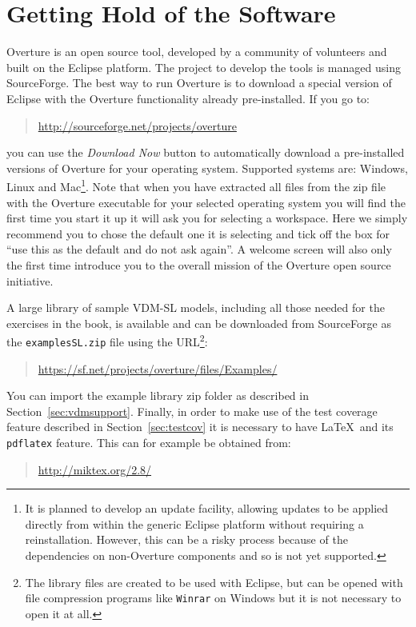 {\section{Getting Hold of the Software}\label{sec:install}


Overture is an open source tool, developed by a community of volunteers and built on the Eclipse platform. The project to develop the tools is managed using SourceForge.  The best way to run Overture is to download a special version of Eclipse with the Overture functionality already pre-installed. If you go to:
  \begin{quote}
  \url{http://sourceforge.net/projects/overture}
  \end{quote}
  \noindent you can use the \textit{Download Now} button to
  automatically download a pre-installed versions of Overture for your
  operating system.  Supported systems are: Windows, Linux and
  Mac\footnote{It is planned to develop an update facility, allowing
    updates to be applied directly from within the generic Eclipse
    platform without requiring a reinstallation. However, this can be
    a risky process because of the dependencies on non-Overture
    components and so is not yet supported.}.
Note that when you have extracted all files from the zip file with the
Overture executable for your selected operating system you will find
the first time you start it up it will ask you for selecting a
workspace. Here we simply recommend you to chose the default one it is
selecting and tick off the box for ``use this as the default and do
not ask again''. A welcome screen will also only the first time
introduce you to the overall mission of the Overture open source
initiative. 

A large library of sample VDM-SL models, including all those needed
for the exercises in the book, is available and can be downloaded from
SourceForge as the \texttt{examplesSL.zip} file using the
URL\footnote{The library files are created to be used with Eclipse,
  but can be opened with file compression programs like \texttt{Winrar} on
  Windows but it is not necessary to open it at all.}: 
\begin{quote}
\url{https://sf.net/projects/overture/files/Examples/}
\end{quote}
You can import the example library zip folder as described in
Section~\ref{sec:vdmsupport}.  Finally, in order to make use of the
test coverage feature described in Section~\ref{sec:testcov} it is
necessary to have \LaTeX\ and its \texttt{pdflatex} feature. This can
for example be obtained from:
\begin{quote}
\url{http://miktex.org/2.8/}
\end{quote}

}
